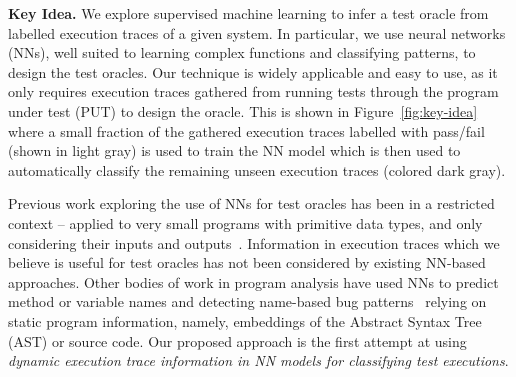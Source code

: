 \textbf{Key Idea.}
We explore supervised machine learning to infer a test oracle from labelled execution traces of a given system. %
In particular, we use neural networks (NNs), well suited to learning complex functions and classifying patterns, to design the test oracles.
Our technique is widely applicable and easy to use, as it only requires execution traces gathered from running tests through the program under test (PUT) to design the oracle. This is shown in Figure~\ref{fig:key-idea} where a small fraction of the gathered execution traces labelled with pass/fail (shown in light gray) is used to train the NN model which is then used to automatically classify the remaining unseen execution traces (colored dark gray). 

Previous work exploring the use of NNs for test oracles has been in a restricted context -- applied to very small programs with primitive data types, and only considering their inputs and outputs~\cite{vanmali2002using, jin2008artificial}. Information in execution traces which we believe is useful for test oracles has not been considered by existing NN-based approaches.
Other bodies of work in program analysis have used NNs
to predict method or variable names and detecting name-based bug patterns~\cite{alon2018code2vec, pradel2018deepbugs} relying on static program information, namely,  embeddings of the Abstract Syntax Tree (AST) or source code. %
Our proposed approach is the first attempt at using \emph{dynamic execution trace information in NN models for classifying test executions}.

